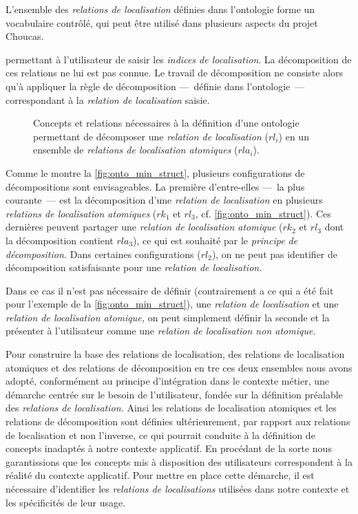L'ensemble des \emph{relations de localisation} définies dans
l'ontologie forme un vocabulaire contrôlé, qui peut être utilisé dans
plusieurs aspects du projet Choucas. 



permettant à l'utilisateur
de saisir les \emph{indices de localisation}. La décomposition de ces
relations ne lui est pas connue. Le travail de décomposition ne
consiste alors qu'à appliquer la règle de décomposition ---~définie
dans l'ontologie~--- correspondant à la \emph{relation de
  localisation} saisie.

\begin{figure}
  \centering
   
  \caption[Structure générale d'une ontologie de
  décomposition]{Concepts et relations nécessaires à la définition
    d'une ontologie permettant de décomposer une \emph{relation de
      localisation} ($rl_i$) en un ensemble de \emph{relations de
      localisation atomiques} ($rla_i$).}
  \label{fig:onto_min_struct}
\end{figure}


Comme le montre la \autoref{fig:onto_min_struct}, plusieurs
configurations de décompositions sont envisageables. La première
d'entre-elles ---~la plus courante~--- est la décomposition d'une
\emph{relation de localisation} en plusieurs \emph{relations de
  localisation atomiques} (\eg \(rk_1\) et \(rl_3\),
cf. \autoref{fig:onto_min_struct}).
%
Ces dernières peuvent partager une \emph{relation de localisation
  atomique} (\eg \(rk_2\) et \(rl_3\) dont la décomposition contient
\(rla_3\)), ce qui est souhaité par le \emph{principe de
  décomposition.}
%
Dans certaines configurations (\eg \(rl_2\)), on ne peut pas
identifier de décomposition satisfaisante pour une \emph{relation de
  localisation.}


Dans ce cas il
n'est pas nécessaire de définir (contrairement a ce qui a été fait
pour l'exemple de la \autoref{fig:onto_min_struct}), une
\emph{relation de localisation} et une \emph{relation de localisation
  atomique,} on peut simplement définir la seconde et la présenter à
l'utilisateur comme une \emph{relation de localisation non atomique.}

Pour construire la base des relations de localisation, des relations
de localisation atomiques et des relations de décomposition en tre ces
deux ensembles nous avons adopté, conformément au principe
d'intégration dans le contexte métier, une démarche centrée sur le
besoin de l'utilisateur, \ie fondée sur la définition préalable des
\emph{relations de localisation.} Ainsi les relations de localisation
atomiques et les relations de décomposition sont définies
ultérieurement, par rapport aux relations de localisation et non
l'inverse, ce qui pourrait conduite à la définition de concepts
inadaptés à notre contexte applicatif.  En procédant de la sorte nous
garantissions que les concepts mis à disposition des utilisateurs
correspondent à la réalité du contexte applicatif. Pour mettre en
place cette démarche, il est nécessaire d'identifier les
\emph{relations de localisations} utilisées dans notre contexte et les
spécificités de leur usage.


